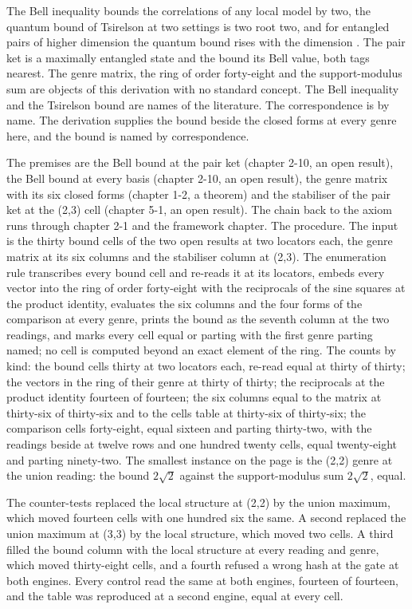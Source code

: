 \begin{chbridge}
The Bell inequality bounds the correlations of any local model by two, the quantum bound of Tsirelson at two settings is two root two, and for entangled pairs of higher dimension the quantum bound rises with the dimension \cite{Bell1964,Tsirelson1980}.
The pair ket is a maximally entangled state and the bound its Bell value, both tags nearest. The genre matrix, the ring of order forty-eight and the support-modulus sum are objects of this derivation with no standard concept. The Bell inequality and the Tsirelson bound are names of the literature. The correspondence is by name. The derivation supplies the bound beside the closed forms at every genre here, and the bound is named by correspondence.
\end{chbridge}
\begin{chproof}[instrument]
The premises are the Bell bound at the pair ket (chapter 2-10, an open result), the Bell bound at every basis (chapter 2-10, an open result), the genre matrix with its six closed forms (chapter 1-2, a theorem) and the stabiliser of the pair ket at the (2,3) cell (chapter 5-1, an open result). The chain back to the axiom runs through chapter 2-1 and the framework chapter. The procedure. The input is the thirty bound cells of the two open results at two locators each, the genre matrix at its six columns and the stabiliser column at (2,3). The enumeration rule transcribes every bound cell and re-reads it at its locators, embeds every vector into the ring of order forty-eight with the reciprocals of the sine squares at the product identity, evaluates the six columns and the four forms of the comparison at every genre, prints the bound as the seventh column at the two readings, and marks every cell equal or parting with the first genre parting named; no cell is computed beyond an exact element of the ring. The counts by kind: the bound cells thirty at two locators each, re-read equal at thirty of thirty; the vectors in the ring of their genre at thirty of thirty; the reciprocals at the product identity fourteen of fourteen; the six columns equal to the matrix at thirty-six of thirty-six and to the cells table at thirty-six of thirty-six; the comparison cells forty-eight, equal sixteen and parting thirty-two, with the readings beside at twelve rows and one hundred twenty cells, equal twenty-eight and parting ninety-two. The smallest instance on the page is the (2,2) genre at the union reading: the bound $2\sqrt{2}$ against the support-modulus sum $2\sqrt{2}$, equal.

The counter-tests replaced the local structure at (2,2) by the union maximum, which moved fourteen cells with one hundred six the same. A second replaced the union maximum at (3,3) by the local structure, which moved two cells. A third filled the bound column with the local structure at every reading and genre, which moved thirty-eight cells, and a fourth refused a wrong hash at the gate at both engines. Every control read the same at both engines, fourteen of fourteen, and the table was reproduced at a second engine, equal at every cell.
\end{chproof}

